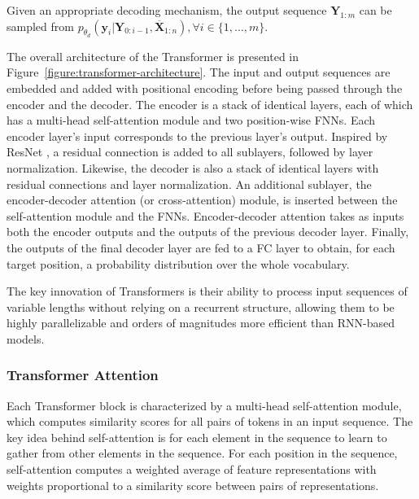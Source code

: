 Given an appropriate decoding mechanism, the output sequence $\bm{Y}_{1:m}$ can be sampled from $p_{\theta_d}\left(\bm{y}_i | \bm{Y}_{0: i-1}, \bm{\overline{X}}_{1:n}\right), \forall i \in \{1, \ldots, m\}$. \\


The overall architecture of the Transformer is presented in Figure~\ref{figure:transformer-architecture}. The input and output sequences are embedded and added with positional encoding before being passed through the encoder and the decoder. The encoder is a stack of identical layers, each of which has a multi-head self-attention module and two position-wise \acp{FNN}. Each encoder layer's input corresponds to the previous layer's output. Inspired by ResNet \citep{he2016deep}, a residual connection is added to all sublayers, followed by layer normalization. Likewise, the decoder is also a stack of identical layers with residual connections and layer normalization. An additional sublayer, the encoder-decoder attention (or cross-attention) module, is inserted between the self-attention module and the \acp{FNN}. Encoder-decoder attention takes as inputs both the encoder outputs and the outputs of the previous decoder layer. Finally, the outputs of the final decoder layer are fed to a \ac{FC} layer to obtain, for each target position, a probability distribution over the whole vocabulary.

The key innovation of Transformers is their ability to process input sequences of variable lengths without relying on a recurrent structure, allowing them to be highly parallelizable and orders of magnitudes more efficient than \ac{RNN}-based models. 


\subsubsection{Transformer Attention}

Each Transformer block is characterized by a multi-head self-attention module, which computes similarity scores for all pairs of tokens in an input sequence. The key idea behind self-attention is for each element in the sequence to learn to gather from other elements in the sequence. For each position in the sequence, self-attention computes a weighted average of feature representations with weights proportional to a similarity score between pairs of representations. 

